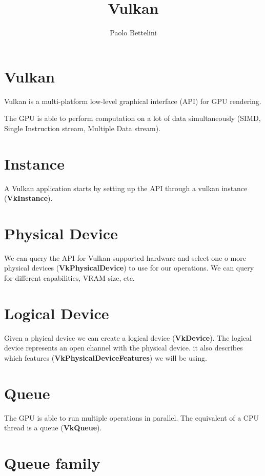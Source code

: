 \documentclass{article}
\title{Vulkan}
\author{Paolo Bettelini}
\date{}
\begin{document}
\maketitle
\tableofcontents
\pagebreak

\section{Vulkan}

Vulkan is a multi-platform low-level graphical interface (API)
for GPU rendering.

The GPU is able to perform computation on a lot of data simultaneously
(SIMD, Single Instruction stream, Multiple Data stream).

\section{Instance}

A Vulkan application starts by setting up the API through a vulkan instance
(\textbf{VkInstance}).

\section{Physical Device}

We can query the API for Vulkan supported hardware and select
one o more physical devices (\textbf{VkPhysicalDevice}) to use for our operations.
We can query for different capabilities, VRAM size, etc.

\section{Logical Device}

Given a phyical device we can create a logical device (\textbf{VkDevice}).
The logical device represents an open channel with the physical device.
it also describes which features (\textbf{VkPhysicalDeviceFeatures}) we will be using.

\section{Queue}

The GPU is able to run multiple operations in parallel.
The equivalent of a CPU thread is a queue (\textbf{VkQueue}).

\section{Queue family}
\end{document}
